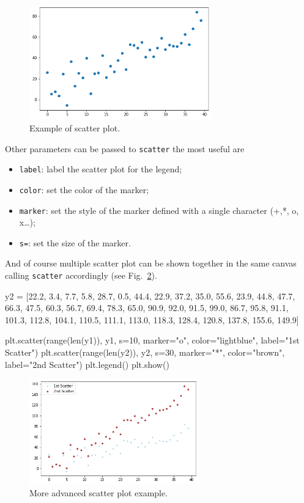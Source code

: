 \begin{figure}[htb]
	\centering
	\includegraphics[width=0.7\textwidth]{figures/scatter}
	\caption{Example of scatter plot.}
	\label{fig:scatter}
\end{figure}

Other parameters can be passed to \texttt{scatter} the most useful are

\begin{itemize}
	\tightlist
	\item
	\texttt{label}: label the scatter plot for the legend;
	\item
	\texttt{color}: set the color of the marker;
	\item
	\texttt{marker}: set the style of the marker defined with a single
	character (+,*, o, x\ldots{});
	\item
	\texttt{s=}: set the size of the marker.
\end{itemize}

And of course multiple scatter plot can be shown together in the same canvas calling \texttt{scatter} accordingly (see Fig.~\ref{fig:scatter2}).

\begin{ipython}
y2 = [22.2, 3.4, 7.7, 5.8, 28.7, 0.5, 44.4, 22.9, 37.2, 35.0, 55.6,
      23.9, 44.8, 47.7, 66.3, 47.5, 60.3, 56.7, 69.4, 78.3, 65.0,
      90.9, 92.0, 91.5, 99.0, 86.7, 95.8, 91.1, 101.3, 112.8,
      104.1, 110.5, 111.1, 113.0, 118.3, 128.4, 120.8, 137.8, 155.6, 149.9]

plt.scatter(range(len(y1)), y1, s=10, marker="o",
color="lightblue", label="1st Scatter")
plt.scatter(range(len(y2)), y2, s=30, marker="*",
color="brown", label="2nd Scatter")
plt.legend()
plt.show()
\end{ipython}

\begin{figure}[htb]
	\centering
	\includegraphics[width=0.65\textwidth]{figures/scatter2}
	\caption{More advanced scatter plot example.}
	\label{fig:scatter2}
\end{figure}

